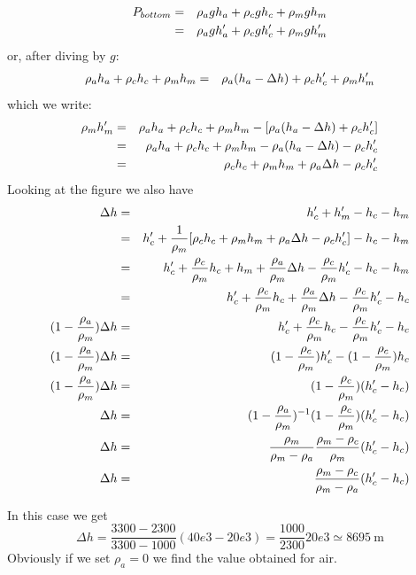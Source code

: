 \begin{eqnarray}
P_{bottom}
&=&\rho_a g h_a + \rho_c g h_c + \rho_m g h_m \nonumber\\
&=& \rho_a g h_a' + \rho_c g h_c' + \rho_m g h_m' \nonumber
\end{eqnarray}
or, after diving by $g$:
\begin{eqnarray}
\rho_a  h_a + \rho_c  h_c + \rho_m  h_m
&=& \rho_a  (h_a-\Delta h) + \rho_c  h_c' + \rho_m  h_m' \nonumber 
\end{eqnarray}
which we write:
\begin{eqnarray}
\rho_m  h_m' 
&=&  \rho_a  h_a + \rho_c  h_c + \rho_m  h_m - [\rho_a  (h_a-\Delta h) + \rho_c  h_c'] \nonumber\\
&=&  \rho_a  h_a + \rho_c  h_c + \rho_m  h_m - \rho_a  (h_a-\Delta h) - \rho_c  h_c' \nonumber\\
&=&  \rho_c  h_c + \rho_m  h_m + \rho_a  \Delta h - \rho_c  h_c' 
\end{eqnarray}
Looking at the figure we also have 
\begin{eqnarray}
\Delta h 
&=& h_c' + h_m' - h_c - h_m \nonumber\\
&=& h_c' + \frac{1}{\rho_m}[\rho_c  h_c + \rho_m  h_m + \rho_a  \Delta h - \rho_c  h_c'] - h_c - h_m \nonumber\\
&=& h_c' + \frac{\rho_c}{\rho_m} h_c +  h_m + \frac{\rho_a}{\rho_m} \Delta h - \frac{\rho_c}{\rho_m} h_c' - h_c - h_m \nonumber\\
&=& h_c' + \frac{\rho_c}{\rho_m} h_c + \frac{\rho_a}{\rho_m} \Delta h - \frac{\rho_c}{\rho_m} h_c' - h_c \nonumber\\
(1 - \frac{\rho_a}{\rho_m})\Delta h &=& h_c' + \frac{\rho_c}{\rho_m} h_c - \frac{\rho_c}{\rho_m} h_c' - h_c \nonumber\\
(1 - \frac{\rho_a}{\rho_m})\Delta h &=& (1 - \frac{\rho_c}{\rho_m})h_c' -(1 - \frac{\rho_c}{\rho_m}) h_c \nonumber\\
(1 - \frac{\rho_a}{\rho_m})\Delta h &=& (1 - \frac{\rho_c}{\rho_m})(h_c' - h_c) \nonumber\\
\Delta h &=&(1 - \frac{\rho_a}{\rho_m})^{-1}  (1 - \frac{\rho_c}{\rho_m})(h_c' - h_c) \nonumber\\
\Delta h &=& \frac{\rho_m}{\rho_m-\rho_a}  \frac{\rho_m-\rho_c}{\rho_m} (h_c' - h_c) \nonumber\\
\Delta h &=&  \frac{\rho_m-\rho_c}{\rho_m-\rho_a} (h_c' - h_c) 
\end{eqnarray}

In this case we get 
\[
\Delta h =  \frac{ 3300- 2300}{3300-1000} (40e3 - 20e3) = \frac{1000}{2300} 20e3 \simeq 8695~\si{\meter} 
\]
Obviously if we set $\rho_a=0$ we find the value obtained for air.

